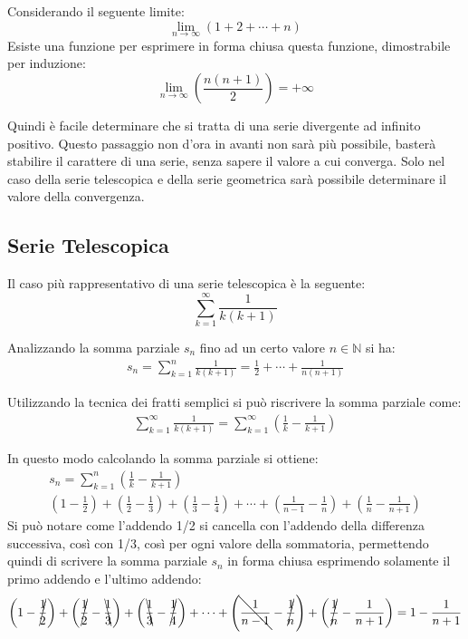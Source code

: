\documentclass{article}
\numberwithin{equation}{subsection}
\begin{document}

Considerando il seguente limite:
\begin{equation*}
    \lim_{n\to\infty}(1+2+\cdots+n)
\end{equation*}
Esiste una funzione per esprimere in forma chiusa questa funzione, dimostrabile per induzione:
\begin{equation*}
    \lim_{n\to\infty}\left(\displaystyle\frac{n(n+1)}{2}\right)=+\infty
\end{equation*}

Quindi è facile determinare che si tratta di una serie divergente ad infinito positivo. Questo passaggio non d'ora in avanti non sarà più possibile, basterà stabilire il carattere di una serie, senza sapere il valore a cui converga. Solo nel caso della serie telescopica e della serie geometrica sarà possibile determinare il valore della convergenza. 

\subsection{Serie Telescopica}

Il caso più rappresentativo di una serie telescopica è la seguente:
\begin{equation}
    \displaystyle\sum_{k=1}^\infty\frac{1}{k(k+1)}
\end{equation}

Analizzando la somma parziale $s_n$ fino ad un certo valore $n\in\mathbb{N}$ si ha:
\begin{gather*}
    s_n=\displaystyle\sum_{k=1}^n\frac{1}{k(k+1)}=\frac{1}{2}+\cdots+\frac{1}{n(n+1)}
\end{gather*} 

Utilizzando la tecnica dei fratti semplici si può riscrivere la somma parziale come:
\begin{gather*}
    \displaystyle\sum_{k=1}^\infty\frac{1}{k(k+1)}=\sum_{k=1}^\infty\left(\frac{1}{k}-\frac{1}{k+1}\right)
\end{gather*}

In questo modo calcolando la somma parziale si ottiene:
\begin{gather*}
    s_n=\displaystyle\sum_{k=1}^n\left(\frac{1}{k}-\frac{1}{k+1}\right)\\
    \left({1}-\frac{1}{2}\right)+
    \left(\frac{1}{2}-\frac{1}{3}\right)+
    \left(\frac{1}{3}-\frac{1}{4}\right)+
    \cdots+
    \left(\frac{1}{n-1}-\frac{1}{n}\right)+
    \left(\frac{1}{n}-\frac{1}{n+1}\right)
\end{gather*}
Si può notare come l'addendo 1/2 si cancella con l'addendo della differenza successiva, così con 1/3, così per ogni valore della sommatoria, permettendo quindi di scrivere la somma parziale $s_n$ in forma chiusa esprimendo solamente il primo addendo e l'ultimo addendo:
\begin{gather*}
    \left({1}-\cancel{\frac{1}{2}}\right)+
    \left(\cancel{\frac{1}{2}}-\bcancel{\frac{1}{3}}\right)+
    \left(\bcancel{\frac{1}{3}}-\cancel{\frac{1}{4}}\right)+
    \cdots+
    \left(\bcancel{\frac{1}{n-1}}-\cancel{\frac{1}{n}}\right)+
    \left(\cancel{\frac{1}{n}}-\frac{1}{n+1}\right)=
    1-\frac{1}{n+1}
\end{gather*}
\end{document}

